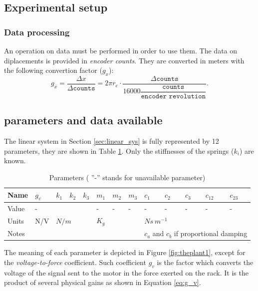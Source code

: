 \documentclass[twosided,a4paper]{article}           %
\begin{document}
\subsection{Experimental setup}
\subsubsection{Data processing}
An operation on data must be performed in order to use them. The data on diplacements is provided in \textit{encoder counts}. They are converted in meters with the following convertion factor ($g_x$):
\begin{equation}
	g_x = \dfrac{\Delta x}{\Delta \texttt{counts}} = 2 \pi r_e \cdot \dfrac{\Delta \texttt{counts}}{16000\dfrac{\texttt{counts}}{\texttt{encoder revolution}}}.
\end{equation}
	\subsection{parameters and data available}
The linear system in Section \ref{sec:linear_sys} is fully represented by 12 parameters, they are shown in Table \ref{tab:parameters}. Only the stiffnesses of the springs ($k_i$) are known.
\begin{table}[H]
	\centering
	\begin{tabular}{|l||l||l|l|l||l|l|l||l|l|l|l|l||}
		\hline
		Name & $g_v$ & $k_1$ & $k_2$ & $k_3$ &  $m_1$ & $m_2$ & $m_3$  &  $c_1$ & $c_2$ & $c_3$  & $c_{12}$ & $c_{23}$ \\
		\hline
		Value & - &  &  &  & - & - & - & - & - & - & - & - \\ 
		\hline
		Units& N/V & \multicolumn{3}{l||}{$N/m$} & \multicolumn{3}{l||}{$K_g$} & \multicolumn{5}{l||}{$Ns \ m^{-1}$} \\ \hline
		Notes &       &       &       &       &       &    &   & \multicolumn{5}{l||}{\small{$c_a$ and $c_b$ if proportional damping}} \\ \hline
	\end{tabular}
\caption{Parameters  ( ''-'' stands for unavailable parameter)}
\label{tab:parameters}
\end{table}
\noindent The meaning of each parameter is depicted in Figure \ref{fig:theplant1}, except for the  \textit{voltage-to-force} coefficient. Such coefficient $g_v$ is the factor which converts the voltage of the signal sent to the motor in the force exerted on the rack. It is the product of several physical gains as shown in Equation \eqref{eq:g_v}.
\end{document}
